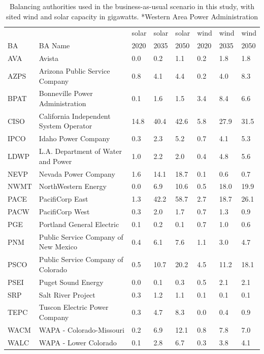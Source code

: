 \documentclass[final]{agujournal2019}
\begin{document}
\begin{table}[ht]
\begin{tabular}{llllllll}
     &                                        & solar & solar & solar & wind & wind & wind \\
BA   & BA Name                                & 2020  & 2035  & 2050  & 2020 & 2035 & 2050 \\
\hline
AVA  & Avista                                 &   0.0 & 0.2 & 1.1 & 0.2 & 1.8 & 1.8 \\ 
AZPS & Arizona Public Service Company         &   0.8 & 4.1 & 4.4 & 0.2 & 4.0 & 8.3 \\ 
BPAT & Bonneville Power Administration        &   0.1 & 1.6 & 1.5 & 3.4 & 8.4 & 6.6 \\ 
CISO & California Independent System Operator &   14.8 & 40.4 & 42.6 & 5.8 & 27.9 & 31.5 \\ 
IPCO & Idaho Power Company                    &   0.3 & 2.3 & 5.2 & 0.7 & 4.1 & 5.3 \\ 
LDWP & L.A. Department of Water and Power     &   1.0 & 2.2 & 2.0 & 0.4 & 4.8 & 5.6 \\ 
NEVP & Nevada Power Company                   &   1.6 & 14.1 & 18.7 & 0.1 & 0.6 & 0.7 \\ 
NWMT & NorthWestern Energy                    &   0.0 & 6.9 & 10.6 & 0.5 & 18.0 & 19.9 \\ 
PACE & PacifiCorp East                        &   1.3 & 42.2 & 58.7 & 2.7 & 18.7 & 26.1 \\ 
PACW & PacifiCorp West                        &   0.3 & 2.0 & 1.7 & 0.7 & 1.3 & 0.9 \\ 
PGE  & Portland General Electric              &   0.1 & 0.2 & 0.1 & 0.7 & 1.0 & 0.6 \\ 
PNM  & Public Service Company of New Mexico   &   0.4 & 6.1 & 7.6 & 1.1 & 3.0 & 4.7 \\ 
PSCO & Public Service Company of Colorado     &   0.5 & 10.7 & 20.2 & 4.5 & 11.2 & 18.1 \\ 
PSEI & Puget Sound Energy                     &   0.0 & 0.1 & 0.3 & 0.5 & 2.1 & 2.1 \\ 
SRP  & Salt River Project                     &   0.3 & 1.2 & 1.1 & 0.1 & 0.1 & 0.1 \\ 
TEPC & Tuscon Electric Power Company          &   0.3 & 4.7 & 8.3 & 0.0 & 0.4 & 0.9 \\ 
WACM & WAPA - Colorado-Missouri               &   0.2 & 6.9 & 12.1 & 0.8 & 7.8 & 7.0 \\ 
WALC & WAPA - Lower Colorado                  &   0.1 & 2.8 & 6.7 & 0.3 & 3.8 & 4.1 \\ 
\hline
\end{tabular}
\caption{Balancing authorities used in the business-as-usual scenario in this study, with sited wind and solar capacity in gigawatts. *Western Area Power Administration}
\label{tab:bas-bau}
\end{table}
\end{document}
